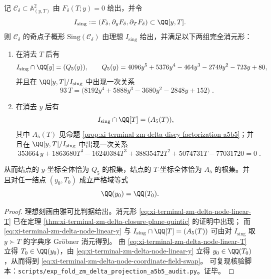 \begin{proposition}[结点子概形的全消元形与坐标域互换同构]\label{prop:xi-terminal-zm-delta-nodes-elimination-a5}
记 \(\mathcal C_\delta\subset\mathbb A^2_{(y,T)}\) 由 \(F_\delta(T;y)=0\) 给出，并令
\[
I_{\mathrm{sing}}:=(F_\delta,\partial_yF_\delta,\partial_TF_\delta)\subset \QQ[y,T].
\]
则 \(\mathcal C_\delta\) 的奇点子概形 \(\mathrm{Sing}(\mathcal C_\delta)\) 由理想 \(I_{\mathrm{sing}}\) 给出，并满足以下两组完全消元形：
\begin{enumerate}
  \item 在消去 \(T\) 后有
  \[
  I_{\mathrm{sing}}\cap \QQ[y]=(Q_5(y)),
  \qquad
  Q_{5}(y)=4096y^{5}+5376y^{4}-464y^{3}-2749y^{2}-723y+80,
  \]
  并且在 \(\QQ[y,T]/I_{\mathrm{sing}}\) 中出现一次关系
  \begin{equation}\label{eq:xi-terminal-zm-delta-node-linear-T}
  \boxed{\;
  93\,T=\bigl(8192y^{4}+5888y^{3}-3680y^{2}-2848y+152\bigr)\; } .
  \end{equation}
  \item 在消去 \(y\) 后有
  \[
  I_{\mathrm{sing}}\cap \QQ[T]=(A_5(T)),
  \]
  其中 \(A_5(T)\) 见命题 \ref{prop:xi-terminal-zm-delta-discy-factorization-a5b5}；并且在 \(\QQ[y,T]/I_{\mathrm{sing}}\) 中出现一次关系
  \begin{equation}\label{eq:xi-terminal-zm-delta-node-linear-y}
  \boxed{\;
  353664\,y+1863680T^{4}-16240384T^{3}+38835472T^{2}+5074731T-77031720=0\; } .
  \end{equation}
\end{enumerate}
从而结点的 \(y\)-坐标全体恰为 \(Q_5\) 的根集，结点的 \(T\)-坐标全体恰为 \(A_5\) 的根集。并且对任一结点 \((y_0,T_0)\) 成立严格域等式
\begin{equation}\label{eq:xi-terminal-zm-delta-node-coordinate-field-swap}
\QQ(y_0)=\QQ(T_0).
\end{equation}
\end{proposition}
\begin{proof}
理想刻画由雅可比判据给出。消元形 \eqref{eq:xi-terminal-zm-delta-node-linear-T} 已在定理 \ref{thm:xi-terminal-zm-delta-closure-plane-quintic} 的证明中出现；
而 \eqref{eq:xi-terminal-zm-delta-node-linear-y} 与 \(I_{\mathrm{sing}}\cap\QQ[T]=(A_5(T))\) 可由对 \(I_{\mathrm{sing}}\) 取 \(y\succ T\) 的字典序 Gröbner 消元得到。
由 \eqref{eq:xi-terminal-zm-delta-node-linear-T} 立得 \(T_0\in\QQ(y_0)\)，由 \eqref{eq:xi-terminal-zm-delta-node-linear-y} 立得 \(y_0\in\QQ(T_0)\)，从而得到 \eqref{eq:xi-terminal-zm-delta-node-coordinate-field-swap}。
可复现核验脚本：\texttt{scripts/exp\_fold\_zm\_delta\_projection\_a5b5\_audit.py}。证毕。
\end{proof}

